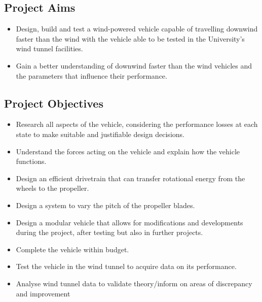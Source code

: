 \subsection{Project Aims}

\begin{itemize}
    \item Design, build and test a wind-powered vehicle capable of travelling downwind faster than the wind with the vehicle able to be tested in the University's wind tunnel facilities.
    \item Gain a better understanding of downwind faster than the wind vehicles and the parameters that influence their performance.
\end{itemize}

\subsection{Project Objectives}

\begin{itemize}
\item Research all aspects of the vehicle, considering the performance losses at each state to make suitable and justifiable design decisions.
\item Understand the forces acting on the vehicle and explain how the vehicle functions.
\item Design an efficient drivetrain that can transfer rotational energy from the wheels to the propeller.
\item Design a system to vary the pitch of the propeller blades.
\item Design a modular vehicle that allows for modifications and developments during the project, after testing but also in further projects.
\item Complete the vehicle within budget.
\item Test the vehicle in the wind tunnel to acquire data on its performance.
\item Analyse wind tunnel data to validate theory/inform on areas of discrepancy and improvement
\end{itemize}




